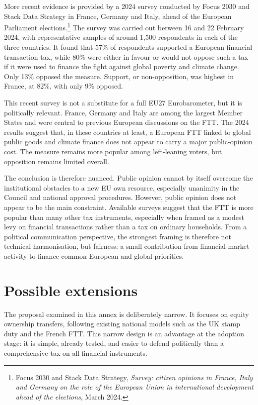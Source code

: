 \documentclass[../main]{subfiles}
\begin{document}
More recent evidence is provided by a 2024 survey conducted by Focus 2030 and Stack Data Strategy in France, Germany and Italy, ahead of the European Parliament elections.\footnote{Focus 2030 and Stack Data Strategy, \textit{Survey: citizen opinions in France, Italy and Germany on the role of the European Union in international development ahead of the elections}, March 2024.} The survey was carried out between 16 and 22 February 2024, with representative samples of around 1,500 respondents in each of the three countries. It found that 57\% of respondents supported a European financial transaction tax, while 80\% were either in favour or would not oppose such a tax if it were used to finance the fight against global poverty and climate change. Only 13\% opposed the measure. Support, or non-opposition, was highest in France, at 82\%, with only 9\% opposed.

This recent survey is not a substitute for a full EU27 Eurobarometer, but it is politically relevant. France, Germany and Italy are among the largest Member States and were central to previous European discussions on the FTT. The 2024 results suggest that, in these countries at least, a European FTT linked to global public goods and climate finance does not appear to carry a major public-opinion cost. The measure remains more popular among left-leaning voters, but opposition remains limited overall.

The conclusion is therefore nuanced. Public opinion cannot by itself overcome the institutional obstacles to a new EU own resource, especially unanimity in the Council and national approval procedures. However, public opinion does not appear to be the main constraint. Available surveys suggest that the FTT is more popular than many other tax instruments, especially when framed as a modest levy on financial transactions rather than a tax on ordinary households. From a political communication perspective, the strongest framing is therefore not technical harmonisation, but fairness: a small contribution from financial-market activity to finance common European and global priorities.

\section{Possible extensions}

The proposal examined in this annex is deliberately narrow. It focuses on equity ownership transfers, following existing national models such as the UK stamp duty and the French FTT. This narrow design is an advantage at the adoption stage: it is simple, already tested, and easier to defend politically than a comprehensive tax on all financial instruments.
\end{document}
